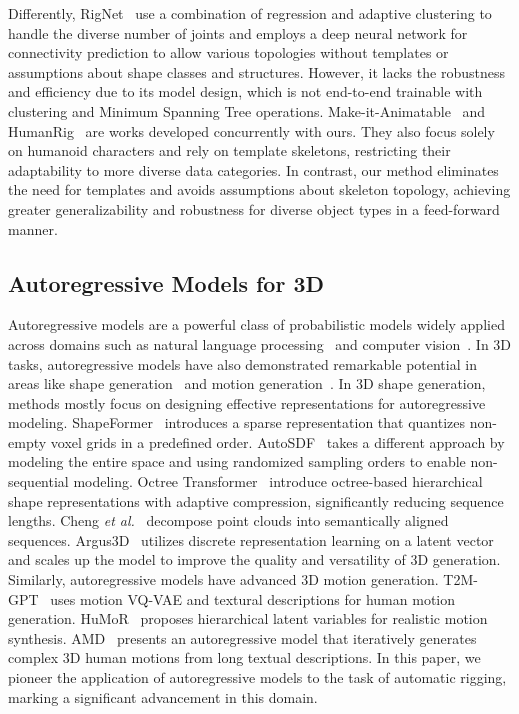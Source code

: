 Differently, RigNet~\cite{rignet} use a combination of regression and adaptive clustering to handle the diverse number of joints and employs a deep neural network for connectivity prediction to allow various topologies without templates or assumptions about shape classes and structures.
% 
However, it lacks the robustness and efficiency due to its model design, which is not end-to-end trainable with clustering and Minimum Spanning Tree operations.
Make-it-Animatable~\cite{guo2024makeitani} and HumanRig~\cite{chu2024humanrig} are works developed concurrently with ours. They also focus solely on humanoid characters and rely on template skeletons, restricting their adaptability to more diverse data categories. 
% 
In contrast, our method eliminates the need for templates and avoids assumptions about skeleton topology, achieving greater generalizability and robustness for diverse object types in a feed-forward manner.


\subsection{Autoregressive Models for 3D}

Autoregressive models are a powerful class of probabilistic models widely applied across domains such as natural language processing~\cite{brown2020language,achiam2023gpt,radford2019language} and computer vision~\cite{esser2021taming,parmar2018image,chen2020generative,li2024autoregressive}. 
% 
In 3D tasks, autoregressive models have also demonstrated remarkable potential in areas like shape generation~\cite{yan2022shapeformer,mittal2022autosdf,ibing2023octree,cheng2022autoregressive,argus} and motion generation~\cite{t2mgpt,rempe2021humor,han2024amd}.
% 
In 3D shape generation, methods mostly focus on designing effective representations for autoregressive modeling.
% 
ShapeFormer~\cite{yan2022shapeformer} introduces a sparse representation that quantizes non-empty voxel grids in a predefined order.
AutoSDF~\cite{mittal2022autosdf} takes a different approach by modeling the entire space and using randomized sampling orders to enable non-sequential modeling.
Octree Transformer~\cite{ibing2023octree} introduce octree-based hierarchical shape representations with adaptive compression, significantly reducing sequence lengths.
Cheng \textit{et al.}~\cite{cheng2022autoregressive} decompose point clouds into semantically aligned sequences.
% 
Argus3D~\cite{argus} utilizes discrete representation learning on a latent vector and scales up the model to improve the quality and versatility of 3D generation. 
% 
Similarly, autoregressive models have advanced 3D motion generation.
T2M-GPT~\cite{t2mgpt} uses motion VQ-VAE and textural descriptions for human motion generation. 
HuMoR~\cite{rempe2021humor} proposes hierarchical latent variables for realistic motion synthesis.
AMD~\cite{han2024amd} presents an autoregressive model that iteratively generates complex 3D human motions from long textual descriptions.
% 
In this paper, we pioneer the application of autoregressive models to the task of automatic rigging, marking a significant advancement in this domain.
